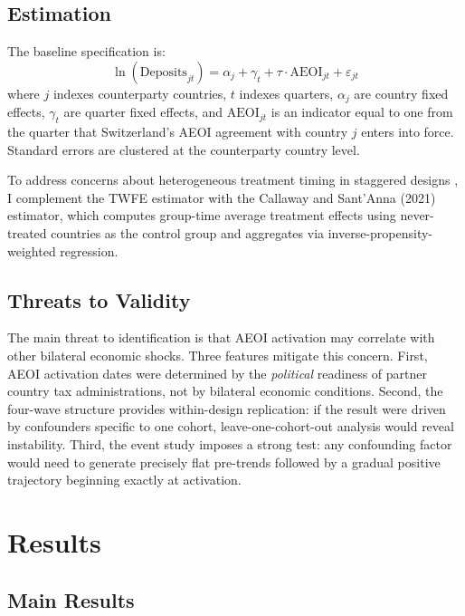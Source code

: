 \documentclass[12pt]{article}
\begin{document}
\subsection{Estimation}

The baseline specification is:
\begin{equation}
\ln(\text{Deposits}_{jt}) = \alpha_j + \gamma_t + \tau \cdot \text{AEOI}_{jt} + \varepsilon_{jt}
\label{eq:twfe}
\end{equation}
where $j$ indexes counterparty countries, $t$ indexes quarters, $\alpha_j$ are country fixed effects, $\gamma_t$ are quarter fixed effects, and $\text{AEOI}_{jt}$ is an indicator equal to one from the quarter that Switzerland's AEOI agreement with country $j$ enters into force. Standard errors are clustered at the counterparty country level.

To address concerns about heterogeneous treatment timing in staggered designs \citep{de2020two, goodman2021difference, callaway2021difference}, I complement the TWFE estimator with the Callaway and Sant'Anna (2021) estimator, which computes group-time average treatment effects using never-treated countries as the control group and aggregates via inverse-propensity-weighted regression.

\subsection{Threats to Validity}

The main threat to identification is that AEOI activation may correlate with other bilateral economic shocks. Three features mitigate this concern. First, AEOI activation dates were determined by the \textit{political} readiness of partner country tax administrations, not by bilateral economic conditions. Second, the four-wave structure provides within-design replication: if the result were driven by confounders specific to one cohort, leave-one-cohort-out analysis would reveal instability. Third, the event study imposes a strong test: any confounding factor would need to generate precisely flat pre-trends followed by a gradual positive trajectory beginning exactly at activation.

\section{Results}

\subsection{Main Results}
\end{document}
